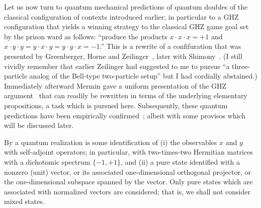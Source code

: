\documentclass[sn-mathphys]{sn-jnl}%
\theoremstyle{thmstyleone}%
\theoremstyle{thmstyletwo}%
\theoremstyle{thmstylethree}%
\begin{document}
Let us now turn to quantum mechanical predictions of quantum doubles of the classical configuration of contexts introduced earlier;
in particular to a GHZ configuration that yields a winning strategy to the classical GHZ game
goal set by the prison ward as follows:
``produce the products
$x \cdot x\cdot x = +1$ and  $x\cdot y\cdot y=y\cdot x\cdot y=y\cdot y\cdot x=-1$.''
This is a rewrite of a confifuration that was presented
by Greenberger, Horne and Zeilinger~\cite{ghz},
later with Shimony~\cite{ghsz}.
(I still vividly remember that earlier Zeilinger
had suggested to me to pursue  ``a three-particle analog of the Bell-type two-particle setup'' but I had cordially abstained.)
Immediately afterward Mermin gave a uniform presentation of the GHZ argument~\cite{mermin90b,mermin1}
that can readily be rewritten in terms of the underlying elementary propositions,
a task which is pursued here.
Subsequently, these quantum predictions have been empirically confirmed~\cite{PhysRevLett.82.1345,panbdwz};
albeit with some provisos which will be discussed later.

By a quantum realization is some identification of (i) the observables ${{x}}$ and ${{y}}$
with self-adjoint operators; in particular, with two-times-two Hermitian matrices with a dichotomic spectrum $\{-1,+1\}$,
and (ii) a pure state identified with a nonzero (unit) vector, or its associated one-dimensional orthogonal projector,
or the one-dimensional subspace spanned by the vector.
Only pure states which are associated with normalized vectors are considered; that is, we shall not consider mixed states.
\end{document}
